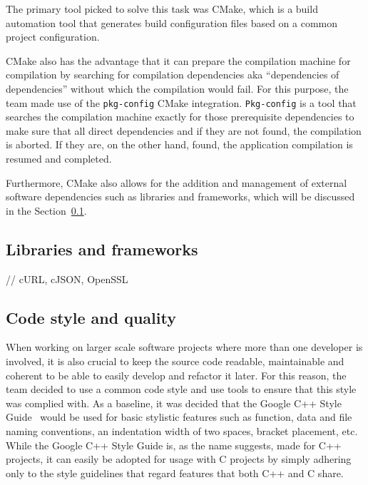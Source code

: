 The primary tool picked to solve this task was CMake, which is a build automation tool that generates build
configuration files based on a common project configuration.

CMake also has the advantage that it can prepare the compilation machine for compilation by searching for compilation
dependencies aka ``dependencies of dependencies'' without which the compilation would fail.
For this purpose, the team made use of the \lstinline{pkg-config} CMake integration. \lstinline{Pkg-config} is a tool
that searches the compilation machine exactly for those prerequisite dependencies to make sure that all direct
dependencies and if they are not found, the compilation is aborted.
If they are, on the other hand, found, the application compilation is resumed and completed.


Furthermore, CMake also allows for the addition and management of external software dependencies such as libraries
and frameworks, which will be discussed in the Section~\ref{subsec:libraries-and-frameworks}.

\subsection{Libraries and frameworks}\label{subsec:libraries-and-frameworks}

// cURL, cJSON, OpenSSL

\subsection{Code style and quality}\label{subsec:code-style-and-quality}

When working on larger scale software projects where more than one developer is involved, it is also crucial to keep the
source code readable, maintainable and coherent to be able to easily develop and refactor it later.
For this reason, the team decided to use a common code style and use tools to ensure that this style was complied with.
As a baseline, it was decided that the Google C++ Style Guide~\cite{google-style} would be used for basic stylistic
features such as function, data and file naming conventions, an indentation width of two spaces, bracket placement, etc.
While the Google C++ Style Guide is, as the name suggests, made for C++ projects, it can easily be adopted for usage
with C projects by simply adhering only to the style guidelines that regard features that both C++ and C share.


